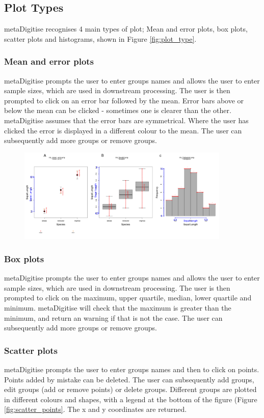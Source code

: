 \documentclass{article}
\begin{document}
\subsection{Plot Types}
metaDigitise recognises 4 main types of plot; Mean and error plots, box plots, scatter plots and histograms, shown in Figure \ref{fig:plot_type}. 

\subsubsection{Mean and error plots} 
metaDigitise prompts the user to enter groups names and allows the user to enter sample sizes, which are used in downstream processing. The user is then prompted to click on an error bar followed by the mean. Error bars above or below the mean can be clicked - sometimes one is clearer than the other. metaDigitise assumes that the error bars are symmetrical. Where the user has clicked the error is displayed in a different colour to the mean. The user can subsequently add more groups or remove groups.

\begin{figure}[!h] 
 \includegraphics[width=0.9\textwidth]{fig_all_extract.pdf} 
 \caption{ }
\label{fig:all_extract}
\end{figure}


\subsubsection{Box plots}
 metaDigitise prompts the user to enter groups names and allows the user to enter sample sizes, which are used in downstream processing. The user is then prompted to click on the maximum, upper quartile, median, lower quartile and minimum. metaDigitise will check that the maximum is greater than the minimum, and return an warning if that is not the case. The user can subsequently add more groups or remove groups.

\subsubsection{Scatter plots}
 metaDigitise prompts the user to enter groups names and then to click on points. Points added by mistake can be deleted. The user can subsequently add groups, edit groups (add or remove points) or delete groups. Different groups are plotted in different colours and shapes, with a legend at the bottom of the figure (Figure \ref{fig:scatter_points}. The x and y coordinates are returned.
\end{document}

